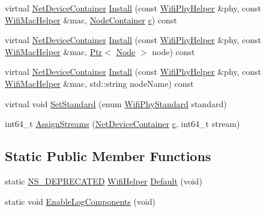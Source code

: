 \begin{DoxyCompactItemize}
\item 
virtual \hyperlink{classns3_1_1NetDeviceContainer}{Net\+Device\+Container} \hyperlink{classns3_1_1WifiHelper_a39585091dec52dfa878f88f91431277c}{Install} (const \hyperlink{classns3_1_1WifiPhyHelper}{Wifi\+Phy\+Helper} \&phy, const \hyperlink{classns3_1_1WifiMacHelper}{Wifi\+Mac\+Helper} \&mac, \hyperlink{classns3_1_1NodeContainer}{Node\+Container} \hyperlink{mmwave_2model_2fading-traces_2fading__trace__generator_8m_ae0323a9039add2978bf5b49550572c7c}{c}) const 
\item 
virtual \hyperlink{classns3_1_1NetDeviceContainer}{Net\+Device\+Container} \hyperlink{classns3_1_1WifiHelper_a79b93d2e627fd8566e9d8292c3622160}{Install} (const \hyperlink{classns3_1_1WifiPhyHelper}{Wifi\+Phy\+Helper} \&phy, const \hyperlink{classns3_1_1WifiMacHelper}{Wifi\+Mac\+Helper} \&mac, \hyperlink{classns3_1_1Ptr}{Ptr}$<$ \hyperlink{classns3_1_1Node}{Node} $>$ node) const 
\item 
virtual \hyperlink{classns3_1_1NetDeviceContainer}{Net\+Device\+Container} \hyperlink{classns3_1_1WifiHelper_a54e21046c12ed66da2d56384e2872d16}{Install} (const \hyperlink{classns3_1_1WifiPhyHelper}{Wifi\+Phy\+Helper} \&phy, const \hyperlink{classns3_1_1WifiMacHelper}{Wifi\+Mac\+Helper} \&mac, std\+::string node\+Name) const 
\item 
virtual void \hyperlink{classns3_1_1WifiHelper_aa54f3e61527ef8de318d310045bc5dfd}{Set\+Standard} (enum \hyperlink{group__wifi_ga1299834f4e1c615af3ca738033b76a49}{Wifi\+Phy\+Standard} standard)
\item 
int64\+\_\+t \hyperlink{classns3_1_1WifiHelper_ab29bf13f8726c2e0807a583bfea79777}{Assign\+Streams} (\hyperlink{classns3_1_1NetDeviceContainer}{Net\+Device\+Container} \hyperlink{mmwave_2model_2fading-traces_2fading__trace__generator_8m_ae0323a9039add2978bf5b49550572c7c}{c}, int64\+\_\+t stream)
\end{DoxyCompactItemize}
\subsection*{Static Public Member Functions}
\begin{DoxyCompactItemize}
\item 
static \hyperlink{deprecated_8h_a771fbc06c05c32655c757f56492d98c5}{N\+S\+\_\+\+D\+E\+P\+R\+E\+C\+A\+T\+ED} \hyperlink{classns3_1_1WifiHelper}{Wifi\+Helper} \hyperlink{classns3_1_1WifiHelper_a82e6d8d341e4559893dfc057595da831}{Default} (void)
\item 
static void \hyperlink{classns3_1_1WifiHelper_a9dcf143d52642e94606a9e0f228da2d2}{Enable\+Log\+Components} (void)
\end{DoxyCompactItemize}
